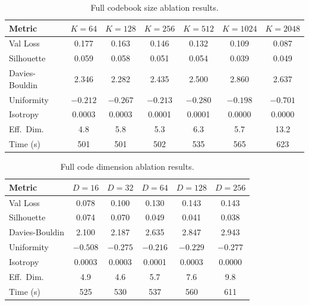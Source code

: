 \documentclass[pmlr]{jmlr}%
\begin{document}
\begin{table}[!ht]
\centering
\caption{Full codebook size ablation results.}
\label{tab:app_codebook}
\small\setlength{\tabcolsep}{4pt}
\begin{tabular}{lcccccc}
\toprule
\textbf{Metric} & $K{=}64$ & $K{=}128$ & $K{=}256$ & $K{=}512$ & $K{=}1024$ & $K{=}2048$ \\
\midrule
Val Loss & 0.177 & 0.163 & 0.146 & 0.132 & 0.109 & 0.087 \\
Silhouette & 0.059 & 0.058 & 0.051 & 0.054 & 0.039 & 0.049 \\
Davies-Bouldin & 2.346 & 2.282 & 2.435 & 2.500 & 2.860 & 2.637 \\
Uniformity & $-0.212$ & $-0.267$ & $-0.213$ & $-0.280$ & $-0.198$ & $-0.701$ \\
Isotropy & 0.0003 & 0.0003 & 0.0001 & 0.0001 & 0.0000 & 0.0000 \\
Eff.\ Dim. & 4.8 & 5.8 & 5.3 & 6.3 & 5.7 & 13.2 \\
Time (s) & 501 & 501 & 502 & 535 & 565 & 623 \\
\bottomrule
\end{tabular}
\end{table}

\vspace{-1ex}
\begin{table}[!ht]
\centering
\caption{Full code dimension ablation results.}
\label{tab:app_codedim}
\small\setlength{\tabcolsep}{5pt}
\begin{tabular}{lccccc}
\toprule
\textbf{Metric} & $D{=}16$ & $D{=}32$ & $D{=}64$ & $D{=}128$ & $D{=}256$ \\
\midrule
Val Loss & 0.078 & 0.100 & 0.130 & 0.143 & 0.143 \\
Silhouette & 0.074 & 0.070 & 0.049 & 0.041 & 0.038 \\
Davies-Bouldin & 2.100 & 2.187 & 2.635 & 2.847 & 2.943 \\
Uniformity & $-0.508$ & $-0.275$ & $-0.216$ & $-0.229$ & $-0.277$ \\
Isotropy & 0.0003 & 0.0003 & 0.0001 & 0.0003 & 0.0000 \\
Eff.\ Dim. & 4.9 & 4.6 & 5.7 & 7.6 & 9.8 \\
Time (s) & 525 & 530 & 537 & 560 & 611 \\
\bottomrule
\end{tabular}
\end{table}
\end{document}
